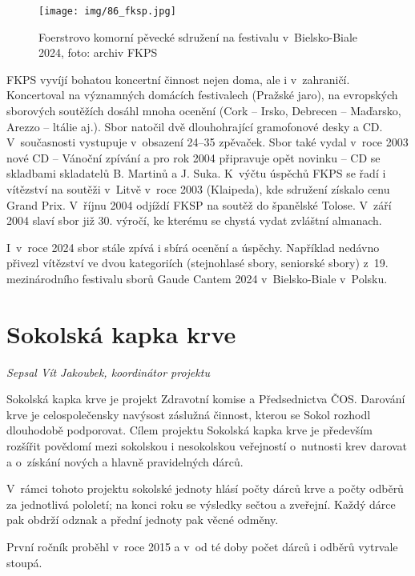 \documentclass[a5paper, 11pt, twoside]{article}
\begin{document}
\begin{figure}[b!]
  \centering 
  \texttt{[image: img/86\_fksp.jpg]}
  \caption*{Foerstrovo komorní pěvecké sdružení na festivalu v~Bielsko-Biale
  2024, foto: archiv FKPS}
\end{figure}

FKPS vyvíjí bohatou koncertní činnost nejen doma, ale i v~zahraničí.
Koncertoval na významných domácích festivalech (Pražské jaro), na
evropských sborových soutěžích dosáhl mnoha ocenění (Cork -- Irsko,
Debrecen -- Maďarsko, Arezzo -- ltálie aj.). Sbor natočil dvě
dlouhohrající gramofonové desky a CD. V~současnosti vystupuje v~obsazení
24--35 zpěvaček. Sbor také vydal v~roce 2003 nové CD -- Vánoční zpívání
a pro rok 2004 připravuje opět novinku -- CD se skladbami skladatelů B.
Martinů a J. Suka. K~výčtu úspěchů FKPS se řadí i vítězství na soutěži
v~Litvě v~roce 2003 (Klaipeda), kde sdružení získalo cenu Grand Prix.
V~říjnu 2004 odjíždí FKSP na soutěž do španělské Tolose. V~září 2004 slaví
sbor již 30. výročí, ke kterému se chystá vydat zvláštní almanach.

I~v~roce 2024 sbor stále zpívá i sbírá ocenění a úspěchy. Například
nedávno přivezl vítězství ve dvou kategoriích (stejnohlasé sbory,
seniorské sbory) z~19. mezinárodního festivalu sborů Gaude Cantem 2024
v~Bielsko-Biale v~Polsku.

\section{Sokolská kapka krve}

\begin{center}
  \textit{Sepsal Vít Jakoubek, koordinátor projektu}
\end{center}

\noindent
Sokolská kapka krve je projekt Zdravotní komise a Předsednictva ČOS.
Darování krve je celospolečensky navýsost záslužná činnost, kterou se
Sokol rozhodl dlouhodobě podporovat. Cílem projektu Sokolská kapka krve
je především rozšířit povědomí mezi sokolskou i nesokolskou veřejností
o~nutnosti krev darovat a o~získání nových a hlavně pravidelných dárců.

V~rámci tohoto projektu sokolské jednoty hlásí počty dárců krve a počty
odběrů za jednotlivá pololetí; na konci roku se výsledky sečtou a
zveřejní. Každý dárce pak obdrží odznak a přední jednoty pak věcné
odměny.

První ročník proběhl v~roce 2015 a v~od té doby počet dárců i odběrů
vytrvale stoupá.
\end{document}
